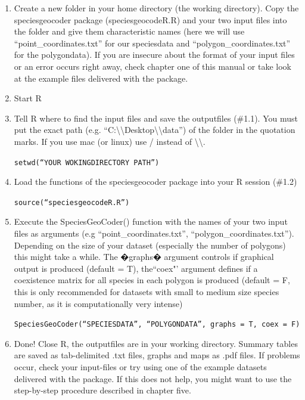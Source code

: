 \documentclass[a4paper,titlepage,11pt]{scrreprt}
\begin{document}
\begin{enumerate}

\item  Create a new folder in your home directory (the working directory). Copy the speciesgeocoder package (speciesgeocodeR.R) and your two input files into the folder and give them characteristic names (here we will use ``point\_coordinates.txt'' for our speciesdata and ``polygon\_coordinates.txt'' for the polygondata). If you are insecure about the format of your input files or an error occurs right away, check chapter one of this manual or take look at the example files delivered with the package.

\item Start R

\item Tell R where to find the input files and save the outputfiles (\#1.1). You must put the exact path (e.g. ``C:\textbackslash \textbackslash Desktop\textbackslash \textbackslash data'') of the folder in the quotation marks. If you use mac (or linux) use / instead of \textbackslash \textbackslash.

\texttt{setwd(``YOUR WOKINGDIRECTORY PATH'')}

\item Load the functions of the speciesgeocoder package into your R session (\#1.2)

\texttt{source(``speciesgeocodeR.R'')}

\item{Execute the SpeciesGeoCoder() function with the names of your two input files as arguments (e.g ``point\_coordinates.txt'', ``polygon\_coordinates.txt''). Depending on the size of your dataset (especially the number of polygons) this might take a while. The �graphs� argument controls if graphical output is produced (default = T), the``coex"' argument defines if a coexistence matrix for all species in each polygon is produced (default = F, this is only recommended for datasets with small to medium size species number, as it is computationally very intense)}

\texttt{SpeciesGeoCoder(``SPECIESDATA'', ``POLYGONDATA'',  graphs = T, coex = F)}

\item{Done! Close R, the outputfiles are in your working directory. Summary tables are saved as tab-delimited .txt files, graphs and maps as .pdf files. If problems occur, check your input-files or try using one of the example datasets delivered with the package. If this does not help, you might want to use the step-by-step procedure described in chapter five.}


\end{enumerate}
\end{document}
